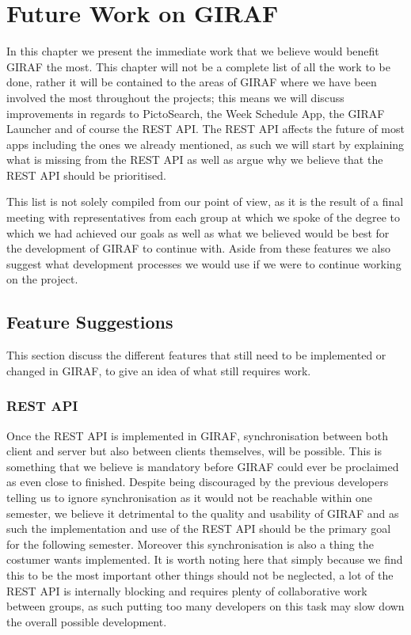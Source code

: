 \chapter{Future Work on GIRAF}\label{chp:futureworks}
In this chapter we present the immediate work that we believe would benefit GIRAF the most.
This chapter will not be a complete list of all the work to be done, rather it will be contained to the areas of GIRAF where we have been involved the most throughout the projects; this means we will discuss improvements in regards to PictoSearch, the Week Schedule App, the GIRAF Launcher and of course the REST API.
The REST API affects the future of most apps including the ones we already mentioned, as such we will start by explaining what is missing from the REST API as well as argue why we believe that the REST API should be prioritised.

This list is not solely compiled from our point of view, as it is the result of a final meeting with representatives from each group at which we spoke of the degree to which we had achieved our goals as well as what we believed would be best for the development of GIRAF to continue with.
Aside from these features we also suggest what development processes we would use if we were to continue working on the project.

\section{Feature Suggestions}
This section discuss the different features that still need to be implemented or changed in GIRAF, to give an idea of what still requires work.

\subsection*{REST API}
Once the REST API is implemented in GIRAF, synchronisation between both client and server but also between clients themselves, will be possible.
This is something that we believe is mandatory before GIRAF could ever be proclaimed as even close to finished.
Despite being discouraged by the previous developers telling us to ignore synchronisation as it would not be reachable within one semester, we believe it detrimental to the quality and usability of GIRAF and as such the implementation and use of the REST API should be the primary goal for the following semester.
Moreover this synchronisation is also a thing the costumer wants implemented.
It is worth noting here that simply because we find this to be the most important other things should not be neglected, a lot of the REST API is internally blocking and requires plenty of collaborative work between groups, as such putting too many developers on this task may slow down the overall possible development.

